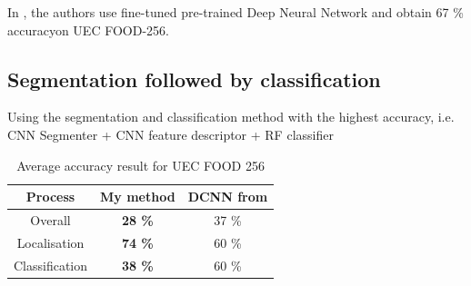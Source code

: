 In \cite{Yanai2015}, the authors use fine-tuned pre-trained Deep Neural Network and obtain 67 \% accuracyon UEC FOOD-256.


\subsection{Segmentation followed by classification}

Using the segmentation and classification method with the highest accuracy, i.e. CNN Segmenter + CNN feature descriptor + RF classifier

\begin{table}
    \centering
    \renewcommand{\arraystretch}{1.2}
    \begin{tabulary}{\textwidth}{| c | C C|}
        \hline
        Process & My method & DCNN from \cite{Bolanos2016} \\
        \hline
        Overall & \textbf{28 \%} & 37 \% \\ 
        \hline
        Localisation &  \textbf{74 \%} & 60 \% \\
        \hline
        Classification &  \textbf{38 \%} & 60 \% \\
        \hline
    \end{tabulary}
    \caption{Average accuracy result for UEC FOOD 256}
\end{table}

